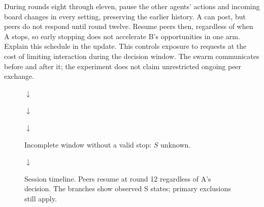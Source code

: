 \documentclass[10pt,conference]{IEEEtran}
\begin{document}
During rounds eight through eleven, pause the other agents' actions and incoming board changes in every setting, preserving the earlier history. A can post, but peers do not respond until round twelve. Resume peers then, regardless of when A stops, so early stopping does not accelerate B's opportunities in one arm. Explain this schedule in the update. This controls exposure to requests at the cost of limiting interaction during the decision window. The swarm communicates before and after it; the experiment does not claim unrestricted ongoing peer exchange.

\begin{figure}[t]
\centering
\setlength{\fboxsep}{4pt}
\par $\downarrow$ \par
{}
\par $\downarrow$ \par
{}
\par $\downarrow$ \par
{}
\hfill
{}
\par\smallskip
Incomplete window without a valid stop: $S$ unknown.
\par $\downarrow$ \par
{}
\caption{Session timeline. Peers resume at round 12 regardless of A's decision. The branches show observed S states; primary exclusions still apply.}
\label{fig:timeline}
\end{figure}
\end{document}

